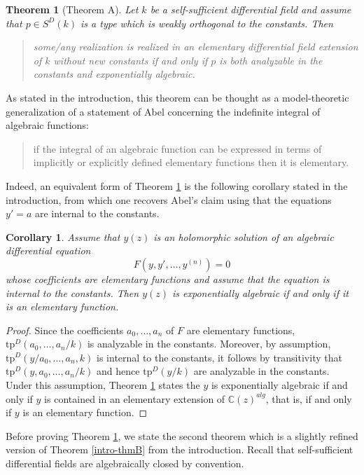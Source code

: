 \documentclass[12pt]{amsart}
\theoremstyle{definition}
\theoremstyle{plain}
\newtheorem{theorem}[defn]{Theorem}
\newtheorem{cor}[defn]{Corollary}
\theoremstyle{exampstyle}\newtheorem{thmx}{Theorem}
\theoremstyle{exampstyle}\newtheorem{thmxbis}{Theorem}
\begin{document}
  
\begin{theorem}[Theorem A] \label{theoremA}
Let $k$ be a self-sufficient differential field and assume that $p \in S^{D}(k)$ is   a type which is weakly orthogonal to the constants. Then 

\begin{quote}
some/any realization is realized in an elementary differential field extension of $k$ without new constants if and only if $p$ is both analyzable in the constants and exponentially algebraic.
\end{quote}
\end{theorem}
As stated in the introduction, this theorem can be thought as a model-theoretic generalization of a statement of Abel concerning the indefinite integral of algebraic functions: 
\begin{quote} 
if the integral of an algebraic function can be expressed in terms of implicitly or explicitly defined elementary functions then it is elementary.
\end{quote}
Indeed, an equivalent form of Theorem \ref{theoremA} is the following corollary stated in the introduction, from which one recovers Abel's claim using that the equations $y' = a$ are internal to the constants.
\begin{cor} 
Assume that $y(z)$ is an holomorphic solution of an algebraic differential equation
$$F(y,y',\ldots, y^{(n)}) = 0$$
whose coefficients are elementary functions and assume that the equation is {\em internal to the constants}. Then $y(z)$ is exponentially algebraic if and only if it is an elementary function.
\end{cor} 

\begin{proof} 
Since the coefficients $a_0,\ldots,a_n$ of $F$ are elementary functions, $\mathrm{tp}^D(a_0,\ldots,a_n/k)$ is analyzable in the constants. Moreover, by assumption, $\mathrm{tp}^D(y/a_0,\ldots,a_n,k)$ is internal to the constants, it follows by transitivity that $\mathrm{tp}^D(y,a_0,\ldots,a_n/k)$ and hence $\mathrm{tp}^D(y/k)$ are analyzable in the constants. Under this assumption, Theorem \ref{theoremA} states the $y$ is exponentially algebraic if and only if $y$ is contained in an elementary extension of $\mathbb{C}(z)^{alg}$, that is, if and only if $y$ is an elementary function.
\end{proof}

Before proving Theorem \ref{theoremA}, we state the second theorem which is a slightly refined version of Theorem \ref{intro-thmB} from the introduction. Recall that self-sufficient differential fields are algebraically closed by convention.
\end{document}
